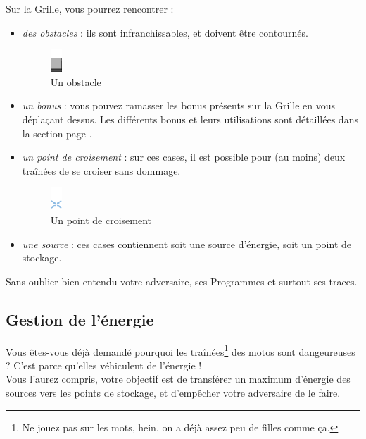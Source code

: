 Sur la Grille, vous pourrez rencontrer :

\begin{itemize}
  \item \emph{des obstacles} : ils sont infranchissables,
    et doivent être contournés.
    \begin{figure}[!h]
    \centering
    \includegraphics{../data/graphics/terrain-obstacle.png}
    \caption{Un obstacle}
    \end{figure}

  \item \emph{un bonus} : vous pouvez ramasser les bonus présents
    sur la Grille en vous déplaçant dessus. Les différents bonus et
    leurs utilisations sont détaillées dans la section page \pageref{section-bonus}.
  \item \emph{un point de croisement} : sur ces cases, il est
    possible pour (au moins) deux traînées de se croiser sans dommage.
    \begin{figure}[!h]
    \centering
    \includegraphics{../data/graphics/terrain-point_croisement.png}
    \caption{Un point de croisement}
    \end{figure}
  \item \emph{une source} : ces cases contiennent soit une
    source d'énergie, soit un point de stockage.
\end{itemize}

Sans oublier bien entendu votre adversaire, ses Programmes et surtout
ses traces.\\

\subsection{Gestion de l'énergie}
Vous êtes-vous déjà demandé pourquoi les traînées\footnote{Ne jouez pas sur les mots, hein, on a déjà assez peu de filles comme ça.} des motos sont
dangeureuses ? C'est parce qu'elles véhiculent de l'énergie !\\

Vous l'aurez compris, votre objectif est de transférer un maximum
d'énergie des sources vers les points de stockage, et d'empêcher votre
adversaire de le faire.

